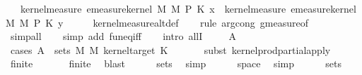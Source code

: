 \begin{isabellebody}
\ \ \ {\isachardoublequoteopen}kernel{\isacharunderscore}{\kern0pt}measure\ {\isacharparenleft}{\kern0pt}emeasure{\isacharunderscore}{\kern0pt}kernel\ M\ M\ {\isasymOtimes}\isactrlsub P\ K{\isacharparenright}{\kern0pt}\ x\ {\isacharequal}{\kern0pt}\ kernel{\isacharunderscore}{\kern0pt}measure\ {\isacharparenleft}{\kern0pt}emeasure{\isacharunderscore}{\kern0pt}kernel\ M\ M\ {\isasymOtimes}\isactrlsub P\ K{\isacharparenright}{\kern0pt}\ y{\isachardoublequoteclose}\isanewline
\ \isanewline
%
\isadelimproof
\ \ %
\endisadelimproof
%
\isatagproof
{}\isamarkupfalse%
\ kernel{\isacharunderscore}{\kern0pt}measure{\isacharunderscore}{\kern0pt}altdef\isanewline
\ \ \isamarkupfalse%
\ {\isacharparenleft}{\kern0pt}rule\ arg{\isacharunderscore}{\kern0pt}cong{}{\isacharbrackleft}{\kern0pt}\ g{\isacharequal}{\kern0pt}measure{\isacharunderscore}{\kern0pt}of{\isacharbrackright}{\kern0pt}{\isacharparenright}{\kern0pt}\isanewline
\ \ \ \ \isamarkupfalse%
\ simp{\isacharunderscore}{\kern0pt}all\isanewline
\ \ \isamarkupfalse%
\ {\isacharparenleft}{\kern0pt}simp\ add{\isacharcolon}{\kern0pt}\ fun{\isacharunderscore}{\kern0pt}eq{\isacharunderscore}{\kern0pt}iff{\isacharparenright}{\kern0pt}\isanewline
\ \ \isamarkupfalse%
\ {\isacharparenleft}{\kern0pt}intro\ allI{\isacharparenright}{\kern0pt}\isanewline
\ \ \isamarkupfalse%
\ \ A{\isacharprime}{\kern0pt}\isanewline
\ \ \ \ \isamarkupfalse%
\ {\isacharparenleft}{\kern0pt}cases\ {\isachardoublequoteopen}A{\isacharprime}{\kern0pt}\ {\isasymin}\ sets\ {\isacharparenleft}{\kern0pt}M\ {\isasymOtimes}\isactrlsub M\ kernel{\isacharunderscore}{\kern0pt}target\ K{\isacharparenright}{\kern0pt}{\isachardoublequoteclose}{\isacharparenright}{\kern0pt}\isanewline
\ \ \ \ \ \isamarkupfalse%
\ {\isacharparenleft}{\kern0pt}subst\ kernel{\isacharunderscore}{\kern0pt}prod{\isacharunderscore}{\kern0pt}partial{\isacharunderscore}{\kern0pt}apply{\isacharparenright}{\kern0pt}\isanewline
\ \ \ \ \isamarkupfalse%
\ finite\ \isamarkupfalse%
\isanewline
\ \ \ \ \isamarkupfalse%
\ finite\ \isamarkupfalse%
\ blast\isanewline
\ \ \ \ \isamarkupfalse%
\ sets\ \isamarkupfalse%
\ simp\isanewline
\ \ \ \ \isamarkupfalse%
\ space\ \isamarkupfalse%
\ simp\isanewline
\ \ \ \ \isamarkupfalse%
\ sets\ \isamarkupfalse%

\end{isabellebody}
